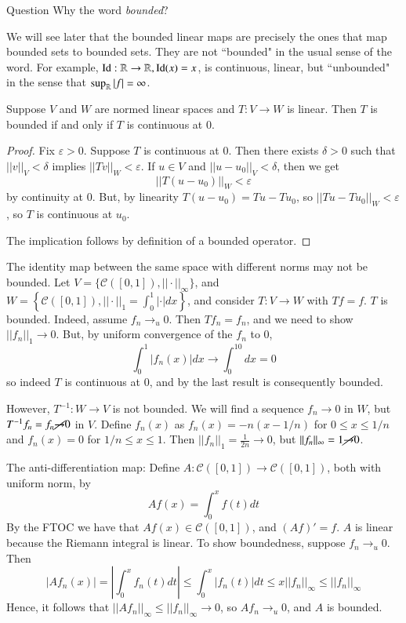 \begin{question}{Question}
    Why the word \emph{bounded}?
\end{question}
We will see later that the bounded linear maps are precisely the ones that map bounded sets to bounded sets. They are not ``bounded" in the usual sense of the word. For example, $\operatorname{Id}:\mathbb R\rightarrow \mathbb R, \operatorname{Id}(x) = x$, is continuous, linear, but ``unbounded" in the sense that $\sup_{\mathbb R}|f| = \infty$.

\begin{proposition}
    Suppose $V$ and $W$ are normed linear spaces and $T:V\rightarrow W$ is linear. Then $T$ is bounded if and only if $T$ is continuous at $0$.
\end{proposition}
\begin{proof}
    Fix $\varepsilon > 0$. Suppose $T$ is continuous at $0$. Then there exists $\delta > 0$ such that $||v||_V < \delta$ implies $||Tv||_W < \varepsilon$. If $u \in V$ and $||u-u_0||_V < \delta$, then we get $$||T(u-u_0)||_W < \varepsilon$$ by continuity at $0$. But, by linearity $T(u-u_0) = Tu - Tu_0$, so $||Tu-Tu_0||_W <\varepsilon$, so $T$ is continuous at $u_0$.

    The implication follows by definition of a bounded operator.
\end{proof}

\begin{example}
    The identity map between the same space with different norms may not be bounded. Let $V = \{\mathcal{C}([0,1]),||\cdot||_{\infty}\}$, and $W = \left\{\mathcal{C}([0,1]),||\cdot||_1 = \int_0^1|\cdot|dx\right\}$, and consider $T:V\rightarrow W$ with $Tf = f$. $T$ is bounded. Indeed, assume $f_n\rightarrow_u0$. Then $Tf_n = f_n$, and we need to show $||f_n||_1 \rightarrow 0$. But, by uniform convergence of the $f_n$ to $0$, $$\int_0^1|f_n(x)|dx\rightarrow \int_0^10dx = 0$$ so indeed $T$ is continuous at $0$, and by the last result is consequently bounded. 

    However, $T^{-1}:W\rightarrow V$ is not bounded. We will find a sequence $f_n\rightarrow 0$ in $W$, but $T^{-1}f_n = f_n\cancel{\rightarrow}0$ in $V$. Define $f_n(x)$ as $f_n(x) = -n(x-1/n)$ for $0 \leq x \leq 1/n$ and $f_n(x) = 0$ for $1/n\leq x\leq 1$. Then $||f_n||_1 = \frac{1}{2n}\rightarrow 0$, but $||f_n||_{\infty} = 1\cancel{\rightarrow} 0$.
\end{example}


\begin{example}
    The anti-differentiation map: Define $A:\mathcal{C}([0,1])\rightarrow \mathcal{C}([0,1])$, both with uniform norm, by $$Af(x) = \int_0^xf(t)dt$$ By the FTOC we have that $Af(x) \in \mathcal{C}([0,1])$, and $(Af)' = f$. $A$ is linear because the Riemann integral is linear. To show boundedness, suppose $f_n\rightarrow_u0$. Then $$|Af_n(x)| = \left|\int_0^xf_n(t)dt\right| \leq \int_0^x|f_n(t)|dt \leq x||f_n||_{\infty} \leq ||f_n||_{\infty}$$ Hence, it follows that $||Af_n||_{\infty} \leq ||f_n||_{\infty} \rightarrow 0$, so $Af_n\rightarrow_u0$, and $A$ is bounded.
\end{example}

